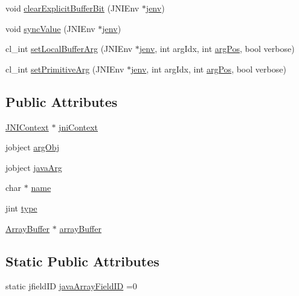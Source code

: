 \begin{DoxyCompactItemize}
\item 
void \hyperlink{class_kernel_arg_ae5df1dec0f6ec684d58b2adf23dd1845}{clear\-Explicit\-Buffer\-Bit} (J\-N\-I\-Env $\ast$\hyperlink{aparapi_8cpp_a31595c73e9a3750524b2ff61b5a14f96}{jenv})
\item 
void \hyperlink{class_kernel_arg_a6a0caaeffc99a55b80361454dda5d091}{sync\-Value} (J\-N\-I\-Env $\ast$\hyperlink{aparapi_8cpp_a31595c73e9a3750524b2ff61b5a14f96}{jenv})
\item 
cl\-\_\-int \hyperlink{class_kernel_arg_a773fa9e962e4c5e72d2cc90f94b5a9c2}{set\-Local\-Buffer\-Arg} (J\-N\-I\-Env $\ast$\hyperlink{aparapi_8cpp_a31595c73e9a3750524b2ff61b5a14f96}{jenv}, int arg\-Idx, int \hyperlink{aparapi_8cpp_ab860a017c322839deee8d7bff5f0e180}{arg\-Pos}, bool verbose)
\item 
cl\-\_\-int \hyperlink{class_kernel_arg_aaeb024c19d0269f3a18076bb280c512c}{set\-Primitive\-Arg} (J\-N\-I\-Env $\ast$\hyperlink{aparapi_8cpp_a31595c73e9a3750524b2ff61b5a14f96}{jenv}, int arg\-Idx, int \hyperlink{aparapi_8cpp_ab860a017c322839deee8d7bff5f0e180}{arg\-Pos}, bool verbose)
\end{DoxyCompactItemize}
\subsection*{Public Attributes}
\begin{DoxyCompactItemize}
\item 
\hyperlink{class_j_n_i_context}{J\-N\-I\-Context} $\ast$ \hyperlink{class_kernel_arg_a5247a11aa8a301c025343b80ede7d9f5}{jni\-Context}
\item 
jobject \hyperlink{class_kernel_arg_a6c682f2814e39eca2a5bd66a056e69b5}{arg\-Obj}
\item 
jobject \hyperlink{class_kernel_arg_a34bc41a663249aca5caecbce438ce6a2}{java\-Arg}
\item 
char $\ast$ \hyperlink{class_kernel_arg_acbc4043bda1ccf9dafc93e7eaa7fb8e8}{name}
\item 
jint \hyperlink{class_kernel_arg_ab559d267fed499ad291ddd9b4596dd72}{type}
\item 
\hyperlink{class_array_buffer}{Array\-Buffer} $\ast$ \hyperlink{class_kernel_arg_aa4e252a62dc2f9c9eb1050313d966d02}{array\-Buffer}
\end{DoxyCompactItemize}
\subsection*{Static Public Attributes}
\begin{DoxyCompactItemize}
\item 
static jfield\-I\-D \hyperlink{class_kernel_arg_a6975716f608862b70a40fc562c0ce774}{java\-Array\-Field\-I\-D} =0
\end{DoxyCompactItemize}
